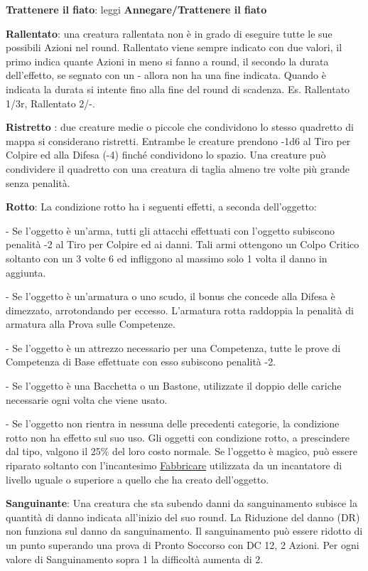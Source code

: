 \begin{multicols}{2}
\textbf{Trattenere il fiato}: leggi \textbf{Annegare/Trattenere il fiato}

\textbf{Rallentato}: una creatura rallentata non è in grado di eseguire tutte le sue possibili Azioni nel round. Rallentato viene sempre indicato con due valori, il primo indica quante Azioni in meno si fanno a round, il secondo la durata dell'effetto, se segnato con un - allora non ha una fine indicata. Quando è indicata la durata si intente fino alla fine del round di scadenza. Es. Rallentato 1/3r, Rallentato 2/-.

\textbf{Ristretto}\hypertarget{ristretto}{} : due creature medie o piccole che condividono lo stesso quadretto di mappa si considerano ristretti. Entrambe le creature prendono -1d6 al Tiro per Colpire ed alla Difesa (-4) finché condividono lo spazio. Una creature può condividere il quadretto con una creatura di taglia almeno tre volte più grande senza penalità.

\textbf{Rotto}: La condizione rotto ha i seguenti effetti, a seconda dell'oggetto:

- Se l'oggetto è un'arma, tutti gli attacchi effettuati con l'oggetto subiscono penalità -2 al Tiro per Colpire ed ai danni. Tali armi ottengono un Colpo Critico soltanto con un 3 volte 6 ed infliggono al massimo solo 1 volta il danno in aggiunta.

- Se l'oggetto è un'armatura o uno scudo, il bonus che concede alla Difesa è dimezzato, arrotondando per eccesso. L'armatura rotta raddoppia la penalità di armatura alla Prova sulle Competenze.

- Se l'oggetto è un attrezzo necessario per una Competenza, tutte le prove di Competenza di Base effettuate con esso subiscono penalità -2.

- Se l'oggetto è una Bacchetta o un Bastone, utilizzate il doppio delle cariche necessarie ogni volta che viene usato.

- Se l'oggetto non rientra in nessuna delle precedenti categorie, la condizione rotto non ha effetto sul suo uso. Gli oggetti con condizione rotto, a prescindere dal tipo, valgono il 25\% del loro costo normale. Se l'oggetto è magico, può essere riparato soltanto con l'incantesimo \hyperlink{Fabbricare}{Fabbricare} utilizzata da un incantatore di livello uguale o superiore a quello che ha creato dell'oggetto.

\textbf{Sanguinante}\hypertarget{sanguinamento}{}: Una creatura che sta subendo danni da sanguinamento subisce la quantità di danno indicata all'inizio del suo round. La Riduzione del danno (DR) non funziona sul danno da sanguinamento. Il sanguinamento può essere ridotto di un punto superando una prova di Pronto Soccorso con DC 12, 2 Azioni.
Per ogni valore di Sanguinamento sopra 1 la difficoltà aumenta di 2.


\end{multicols}

